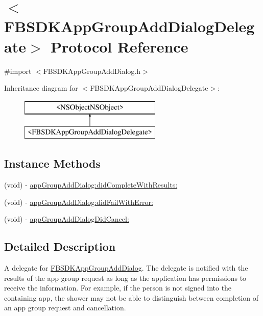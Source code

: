 \hypertarget{protocol_f_b_s_d_k_app_group_add_dialog_delegate-p}{}\section{$<$F\+B\+S\+D\+K\+App\+Group\+Add\+Dialog\+Delegate$>$ Protocol Reference}
\label{protocol_f_b_s_d_k_app_group_add_dialog_delegate-p}


{\ttfamily \#import $<$F\+B\+S\+D\+K\+App\+Group\+Add\+Dialog.\+h$>$}

Inheritance diagram for $<$F\+B\+S\+D\+K\+App\+Group\+Add\+Dialog\+Delegate$>$\+:\begin{figure}[H]
\begin{center}
\leavevmode
\includegraphics[height=2.000000cm]{protocol_f_b_s_d_k_app_group_add_dialog_delegate-p}
\end{center}
\end{figure}
\subsection*{Instance Methods}
\begin{DoxyCompactItemize}
\item 
(void) -\/ \hyperlink{protocol_f_b_s_d_k_app_group_add_dialog_delegate-p_abfcec4aa4e6c80f5220af8983b0bec27}{app\+Group\+Add\+Dialog\+:did\+Complete\+With\+Results\+:}
\item 
(void) -\/ \hyperlink{protocol_f_b_s_d_k_app_group_add_dialog_delegate-p_a0639394cc50c3e8fcaee3ffb8d21c3bb}{app\+Group\+Add\+Dialog\+:did\+Fail\+With\+Error\+:}
\item 
(void) -\/ \hyperlink{protocol_f_b_s_d_k_app_group_add_dialog_delegate-p_a93e2f514934d20fe2a5a15160e123caf}{app\+Group\+Add\+Dialog\+Did\+Cancel\+:}
\end{DoxyCompactItemize}


\subsection{Detailed Description}
A delegate for \hyperlink{interface_f_b_s_d_k_app_group_add_dialog}{F\+B\+S\+D\+K\+App\+Group\+Add\+Dialog}.  The delegate is notified with the results of the app group request as long as the application has permissions to receive the information. For example, if the person is not signed into the containing app, the shower may not be able to distinguish between completion of an app group request and cancellation. 

